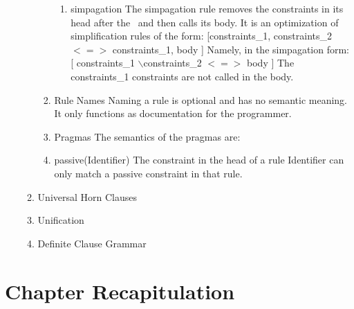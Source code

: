 \documentclass[thesis-solanki.tex]{subfiles}
\begin{document}
\begin{enumerate}
\begin{enumerate}
\begin{enumerate}
\begin{enumerate}
\item simpagation
The simpagation rule removes the constraints in its head after the \ and then calls its body. It is an optimization of simplification rules 
of the form: [constraints\_1, constraints\_2 $<=>$ constraints\_1, body ] Namely, in the simpagation form: [ constraints\_1 
$\backslash$constraints\_2 $<=>$ body ] The constraints\_1 constraints are not called in the body.

\end{enumerate}


\item Rule Names Naming a rule is optional and has no semantic meaning. It only functions as documentation for the programmer.

\item Pragmas The semantics of the pragmas are:

\item passive(Identifier)
The constraint in the head of a rule Identifier can only match a passive constraint in that rule. 

\end{enumerate}

\item Universal Horn Clauses


\item Unification

\item Definite Clause Grammar


\end{enumerate}

\end{enumerate}


\section{Chapter Recapitulation}
\end{document}
